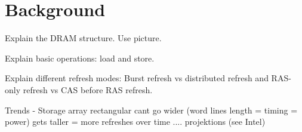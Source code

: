 \section{Background} 
\label{sec:bg}

Explain the DRAM structure. Use picture.

Explain basic operations: load and store.

Explain different refresh modes: Burst refresh vs distributed refresh and RAS-only refresh vs CAS before RAS refresh.

Trends - Storage array rectangular
            cant go wider (word lines length = timing = power)
            gets taller = more refreshes
            over time .... projektions (see Intel)
